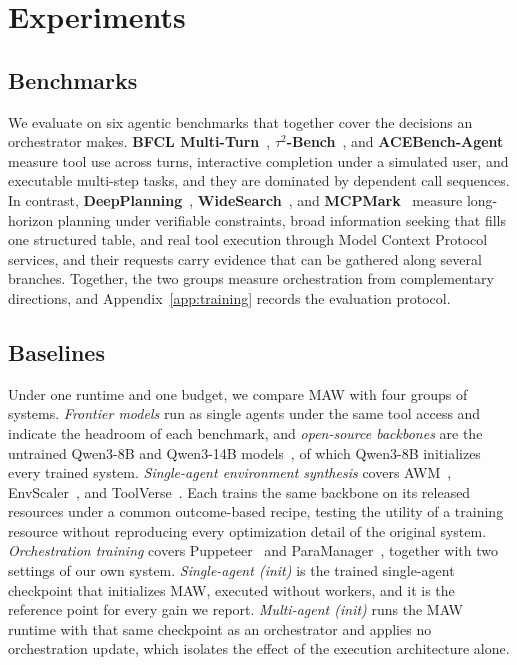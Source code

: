 \section{Experiments}
\label{sec:exp}

\subsection{Benchmarks}

We evaluate on six agentic benchmarks that together cover the decisions an orchestrator makes.
\textbf{BFCL Multi-Turn}~\citep{patil2025bfcl}, \textbf{$\tau^2$-Bench}~\citep{barres2025tau2bench}, and \textbf{ACEBench-Agent}~\citep{chen2025acebench} measure tool use across turns, interactive completion under a simulated user, and executable multi-step tasks, and they are dominated by dependent call sequences.
In contrast, \textbf{DeepPlanning}~\citep{zhang2026deepplanning}, \textbf{WideSearch}~\citep{wong2025widesearch}, and \textbf{MCPMark}~\citep{wu2025mcpmark} measure long-horizon planning under verifiable constraints, broad information seeking that fills one structured table, and real tool execution through Model Context Protocol services, and their requests carry evidence that can be gathered along several branches.
Together, the two groups measure orchestration from complementary directions, and Appendix~\ref{app:training} records the evaluation protocol.

\subsection{Baselines}

Under one runtime and one budget, we compare MAW with four groups of systems.
\emph{Frontier models} run as single agents under the same tool access and indicate the headroom of each benchmark, and \emph{open-source backbones} are the untrained Qwen3-8B and Qwen3-14B models~\citep{yang2025qwen3}, of which Qwen3-8B initializes every trained system.
\emph{Single-agent environment synthesis} covers AWM~\citep{wang2026agentworldmodelinfinity}, EnvScaler~\citep{song2026envscaler}, and ToolVerse~\citep{zhou2026toolverse}.
Each trains the same backbone on its released resources under a common outcome-based recipe, testing the utility of a training resource without reproducing every optimization detail of the original system.
\emph{Orchestration training} covers Puppeteer~\citep{dang2025puppeteer} and ParaManager~\citep{yuan2026paramanager}, together with two settings of our own system.
\emph{Single-agent (init)} is the trained single-agent checkpoint that initializes MAW, executed without workers, and it is the reference point for every gain we report.
\emph{Multi-agent (init)} runs the MAW runtime with that same checkpoint as an orchestrator and applies no orchestration update, which isolates the effect of the execution architecture alone.

